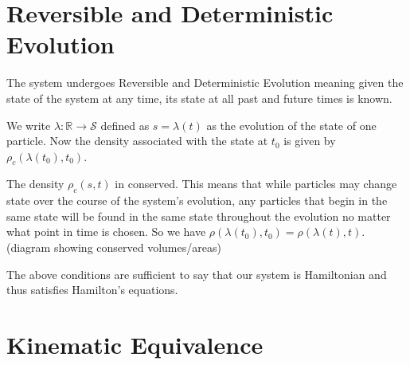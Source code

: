 \documentclass{article}
\begin{document}
\section{Reversible and Deterministic Evolution}

\begin{assump}
	The system undergoes Reversible and Deterministic Evolution meaning given the state of the system at any time, its state at all past and future times is known.
\end{assump}

\begin{defn}
	We write $\lambda: \mathbb{R} \rightarrow \mathcal{S}$ defined as $s = \lambda(t)$ as the evolution of the state of one particle. Now the density associated with the state at $t_0$ is given by $\rho_c(\lambda(t_0),t_0)$.
\end{defn}


\begin{prop}
	The density $\rho_c(s,t)$ in conserved. This means that while particles may change state over the course of the system's evolution, any particles that begin in the same state will be found in the same state throughout the evolution no matter what point in time is chosen. So we have $\rho(\lambda(t_0),t_0) = \rho(\lambda(t),t)$. (diagram showing conserved volumes/areas)
\end{prop}

\begin{prop}
	The above conditions are sufficient to say that our system is Hamiltonian and thus satisfies Hamilton's equations.
\end{prop} 
	

\section{Kinematic Equivalence}
\end{document}
